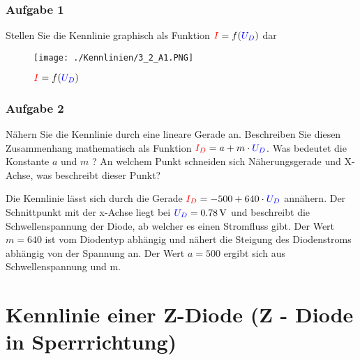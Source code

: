 \documentclass[a4paper,titlepage,parskip]{scrreprt}
\newcommand{\spannung}[1]{\textcolor{blue}{#1}}
\newcommand{\strom}[1]{\textcolor{red}{#1}}
\begin{document}
             \subsubsection{Aufgabe 1} Stellen Sie die Kennlinie graphisch als Funktion $\strom{I} = f(\spannung{U_D})$ dar
                         \begin{figure}[!htbp]
                             \begin{center}
                                 \texttt{[image: ./Kennlinien/3\_2\_A1.PNG]}

                                 \caption{$\strom{I} = f(\spannung{U_D})$}

                                \end{center}
                            \end{figure}
             \subsubsection{Aufgabe 2} Nähern Sie die Kennlinie durch eine lineare Gerade an. Beschreiben Sie diesen Zusammenhang mathematisch als Funktion $\strom{I_D} = a + m \cdot \spannung{U_D}$. Was bedeutet die Konstante $a$ und $m$ ? An welchem Punkt schneiden sich Näherungsgerade und X-Achse, was beschreibt dieser Punkt?
             
Die Kennlinie lässt sich durch die Gerade $\strom{I_D} = -500 + 640 \cdot \spannung{U_D}$ annähern. Der  Schnittpunkt mit der x-Achse liegt bei $\spannung{U_D} = \SI{0,78}{\volt}$ und beschreibt die Schwellenspannung der Diode, ab welcher es einen Stromfluss gibt. Der Wert $m = 640$ ist vom Diodentyp abhängig und nähert die Steigung des Diodenstroms abhängig von der Spannung an. Der Wert $a = 500$ ergibt sich aus Schwellenspannung und m.


        \section{Kennlinie einer Z-Diode (Z - Diode in Sperrrichtung)}
\end{document}
